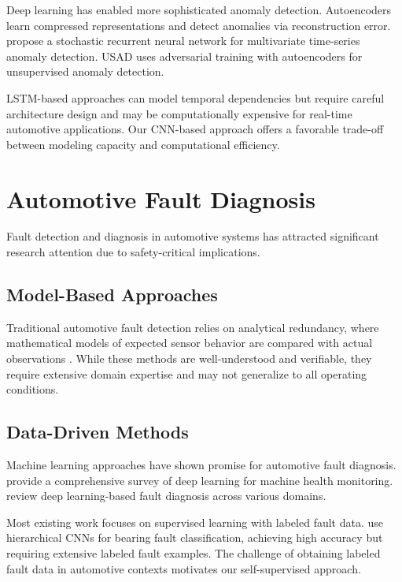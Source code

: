 Deep learning has enabled more sophisticated anomaly detection. Autoencoders learn compressed representations and detect anomalies via reconstruction error. \textcite{su2019robust} propose a stochastic recurrent neural network for multivariate time-series anomaly detection. USAD \parencite{audibert2020usad} uses adversarial training with autoencoders for unsupervised anomaly detection.

LSTM-based approaches can model temporal dependencies but require careful architecture design and may be computationally expensive for real-time automotive applications. Our CNN-based approach offers a favorable trade-off between modeling capacity and computational efficiency.

\section{Automotive Fault Diagnosis}

Fault detection and diagnosis in automotive systems has attracted significant research attention due to safety-critical implications.

\subsection{Model-Based Approaches}

Traditional automotive fault detection relies on analytical redundancy, where mathematical models of expected sensor behavior are compared with actual observations \parencite{iso26262_2018}. While these methods are well-understood and verifiable, they require extensive domain expertise and may not generalize to all operating conditions.

\subsection{Data-Driven Methods}

Machine learning approaches have shown promise for automotive fault diagnosis. \textcite{zhao2019machine} provide a comprehensive survey of deep learning for machine health monitoring. \textcite{wang2020deep} review deep learning-based fault diagnosis across various domains.

Most existing work focuses on supervised learning with labeled fault data. \textcite{lu2020intelligent} use hierarchical CNNs for bearing fault classification, achieving high accuracy but requiring extensive labeled fault examples. The challenge of obtaining labeled fault data in automotive contexts motivates our self-supervised approach.

